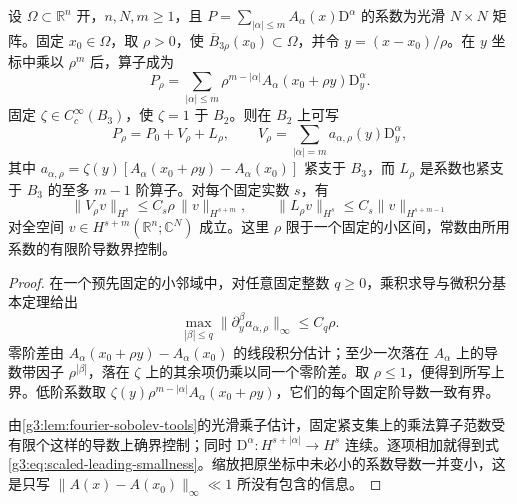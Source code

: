 \begin{lemma}\label{g3:lem:scaled-leading-perturbation}
	设 \(\Omega\subset\mathbb R^n\) 开，\(n,N,m\ge1\)，且 \(P=\sum_{|\alpha|\le m}A_\alpha(x)\mathrm D^\alpha\) 的系数为光滑 \(N\times N\) 矩阵。固定 \(x_0\in\Omega\)，取 \(\rho>0\)，使 \(\overline B_{3\rho}(x_0)\subset\Omega\)，并令 \(y=(x-x_0)/\rho\)。在 \(y\) 坐标中乘以 \(\rho^m\) 后，算子成为
	\[
		P_\rho=\sum_{|\alpha|\le m}\rho^{m-|\alpha|}
		A_\alpha(x_0+\rho y)\mathrm D_y^\alpha.
	\]
	固定 \(\zeta\in C_c^\infty(B_3)\)，使 \(\zeta=1\) 于 \(B_2\)。则在 \(B_2\) 上可写
	\[
		P_\rho=P_0+V_\rho+L_\rho,\qquad
		V_\rho=\sum_{|\alpha|=m}a_{\alpha,\rho}(y)\mathrm D_y^\alpha,
	\]
	其中 \(a_{\alpha,\rho}=\zeta(y)[A_\alpha(x_0+\rho y)-A_\alpha(x_0)]\) 紧支于 \(B_3\)，而 \(L_\rho\) 是系数也紧支于 \(B_3\) 的至多 \(m-1\) 阶算子。对每个固定实数 \(s\)，有
	\begin{equation}\label{g3:eq:scaled-leading-smallness}
		\|V_\rho v\|_{H^s}\le C_s\rho\,\|v\|_{H^{s+m}},
		\qquad
		\|L_\rho v\|_{H^s}\le C_s\|v\|_{H^{s+m-1}}
	\end{equation}
	对全空间 \(v\in H^{s+m}(\mathbb R^n;\mathbb C^N)\) 成立。这里 \(\rho\) 限于一个固定的小区间，常数由所用系数的有限阶导数界控制。
\end{lemma}
\begin{proof}
	在一个预先固定的小邻域中，对任意固定整数 \(q\ge0\)，乘积求导与微积分基本定理给出
	\[
		\max_{|\beta|\le q}\|\partial_y^\beta a_{\alpha,\rho}\|_\infty
		\le C_q\rho.
	\]
	零阶差由 \(A_\alpha(x_0+\rho y)-A_\alpha(x_0)\) 的线段积分估计；至少一次落在 \(A_\alpha\) 上的导数带因子 \(\rho^{|\beta|}\)，落在 \(\zeta\) 上的其余项仍乘以同一个零阶差。取 \(\rho\le1\)，便得到所写上界。低阶系数取
	\(\zeta(y)\rho^{m-|\alpha|}A_\alpha(x_0+\rho y)\)，它们的每个固定阶导数一致有界。

	由\cref{g3:lem:fourier-sobolev-tools}的光滑乘子估计，固定紧支集上的乘法算子范数受有限个这样的导数上确界控制；同时 \(\mathrm D^\alpha:H^{s+|\alpha|}\to H^s\) 连续。逐项相加就得到式\eqref{g3:eq:scaled-leading-smallness}。缩放把原坐标中未必小的系数导数一并变小，这是只写 \(\|A(x)-A(x_0)\|_\infty\ll1\) 所没有包含的信息。
\end{proof}

